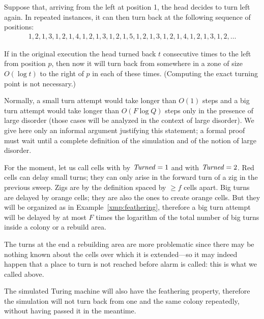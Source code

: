 \documentclass[11pt]{memoir}
\theoremstyle{definition} %
\renewcommand{\ge}{\geq}
\newcommand{\fld}[1]{\ensuremath{\textit{#1\/}}}
\renewcommand{\f}{f} %
\newcommand{\F}{F}
\newcommand{\Q}{Q}
\newcommand{\Turned}{\fld{Turned}}
\begin{document}
\begin{example}[1-feathering]\label{xmp:feathering}
Suppose that, arriving from the left at position 1, the head decides to turn left again.
In repeated instances, it can then turn back at the following sequence of positions:
\begin{align*}
 1, 2, 1, 3, 1, 2, 1, 4, 1, 2, 1, 3, 1, 2, 1, 5, 1, 2, 1, 3, 1, 2, 1, 4, 1, 2, 1, 3, 1, 2, \dots
 \end{align*}
\end{example}

If in the original execution the head turned back \( t \) consecutive
times to the left from position \( p \), then now it will 
turn back from somewhere in a zone of size \( O(\log t) \) to the right of \( p \) in 
each of these times.
(Computing the exact turning point is not necessary.)

Normally, a small turn attempt would take longer than \( O(1) \) steps and
a big turn attempt would take longer than \( O(\F\log\Q) \) steps only in the presence of
large disorder (those cases will be analyzed in the context of large disorder).
We give here only an informal argument justifying this statement; a
formal proof must wait until 
a complete definition of the simulation and of the notion of large disorder.

For the moment, let us call cells   with by \( \Turned=1 \)
and  with \( \Turned=2 \).
Red cells can delay small turns;
they can only arise in the forward turn of a zig in the previous sweep.
Zigs are by the definition spaced by \( \ge\f \) cells apart.
Big turns are delayed by orange cells; they are also the ones to create orange cells.
But they will be organized as in Example~\ref{xmp:feathering},
therefore a big turn attempt will be delayed by at most \( \F \) times the logarithm
of the total number of big turns inside a colony or a rebuild area.

The turns at the end a rebuilding area are more problematic since
there may be nothing known about the cells over which it is extended---so it may indeed
happen that a place to turn is not reached before alarm is called: this is what we called
 above.

The simulated Turing machine will also have the feathering property,
therefore the simulation will not turn back 
from one and the same colony repeatedly, without having passed it in the meantime.
\end{document}
